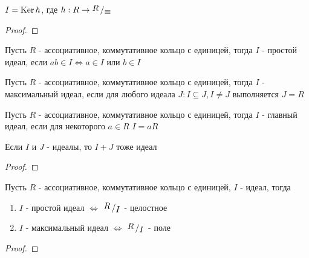 \documentclass[../main/document.tex]{subfiles}
\begin{document}
\begin{cnsq}
$I=\operatorname{Ker} h$, где $h:R\to\bigslant{R}{\equiv} $
\begin{proof}

\end{proof}
\end{cnsq}
\begin{dfn}
Пусть $R$ - ассоциативное, коммутативное кольцо с единицей, тогда $I$ - простой идеал, если $ab\in I\Leftrightarrow a\in I$ или $b\in I$
\end{dfn}
\begin{dfn}
Пусть $R$ - ассоциативное, коммутативное кольцо с единицей, тогда $I$ - максимальный идеал, если для любого идеала $J: I\subseteq J, I\neq J$ выполняется $J=R$
\end{dfn}
\begin{dfn}
Пусть $R$ - ассоциативное, коммутативное кольцо с единицей, тогда $I$ - главный идеал, если для некоторого $a\in R$ $I=aR$
\end{dfn}
\begin{exm}[??????]

\end{exm}
\begin{lemma}
Если $I$ и $J$ - идеалы, то $I+J$ тоже идеал
\begin{proof}

\end{proof}
\end{lemma}
\begin{thm}
Пусть $R$ - ассоциативное, коммутативное кольцо с единицей, $I$ - идеал, тогда
\begin{enumerate}
\item $I$ - простой идеал $\Leftrightarrow$ $\bigslant{R}{I}$ - целостное
\item $I$ - максимальный идеал $\Leftrightarrow$ $\bigslant{R}{I}$ - поле
\end{enumerate}
\begin{proof}

\end{proof}
\end{thm}
\end{document}
